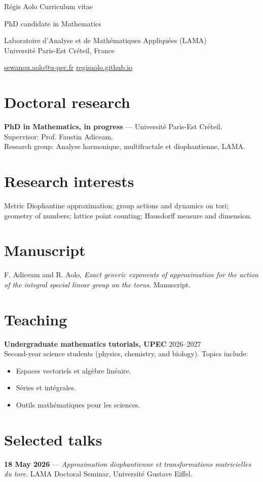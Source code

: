 \documentclass[10pt,a4paper]{article}
\begin{document}
{\Huge\color{ink} Régis Aolo}\hfill {\small\color{muted} Curriculum vitae}

{\large PhD candidate in Mathematics}

Laboratoire d'Analyse et de Mathématiques Appliquées (LAMA)\\
Université Paris-Est Créteil, France

\href{mailto:sewanou.aolo@u-pec.fr}{sewanou.aolo@u-pec.fr}\quad\textbar\quad
\href{https://regisaolo.github.io/}{regisaolo.github.io}

\section{Doctoral research}
\textbf{PhD in Mathematics, in progress} --- Université Paris-Est Créteil.\\
Supervisor: Prof. Faustin Adiceam.\\
Research group: Analyse harmonique, multifractale et diophantienne, LAMA.

\section{Research interests}
Metric Diophantine approximation; group actions and dynamics on tori; geometry of numbers; lattice point counting; Hausdorff measure and dimension.

\section{Manuscript}
F. Adiceam and R. Aolo, \emph{Exact generic exponents of approximation for the action of the integral special linear group on the torus}. Manuscript.

\section{Teaching}
\textbf{Undergraduate mathematics tutorials, UPEC} \hfill 2026--2027\\
Second-year science students (physics, chemistry, and biology). Topics include:
\begin{itemize}
  \item Espaces vectoriels et algèbre linéaire.
  \item Séries et intégrales.
  \item Outils mathématiques pour les sciences.
\end{itemize}

\section{Selected talks}
\textbf{18 May 2026} --- \emph{Approximation diophantienne et transformations matricielles du tore}. LAMA Doctoral Seminar, Université Gustave Eiffel.
\end{document}
